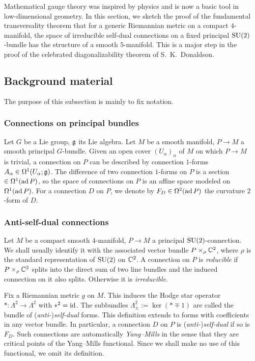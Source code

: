 Mathematical gauge theory was inspired by physics and 
is now a basic tool in low-dimensional geometry. 
In this section, we sketch the proof of the fundamental transversality 
theorem that for a generic Riemannian metric on a compact $4$-manifold, 
the space of irreducible self-dual connections on a fixed principal 
${\mathrm{SU}}(2)$-bundle has the structure of a smooth $5$-manifold. 
This is a major step in the proof of the celebrated 
diagonalizability theorem of S.\ K.\ Donaldson.

\subsection{Background material}
The purpose of this subsection is mainly to fix notation.

\subsubsection{Connections on principal bundles}
Let $G$ be a Lie group, ${\mathfrak{g}}$ its Lie algebra. 
Let $M$ be a smooth manifold, 
$P \to M$ a smooth principal $G$-bundle. 
Given an open cover $(U_\alpha)_\alpha$ of $M$ on which 
$P \to M$ is trivial, a connection on $P$ can be described 
by connection $1$-forms $A_\alpha \in \Omega^1 (U_\alpha; {\mathfrak{g}})$. 
The difference of two connection $1$-forms on $P$ 
is a section $\in \Omega^1 (\operatorname{ad} P)$, so the space of connections 
on $P$ is an affine space modeled on $\Omega^1 (\operatorname{ad} P)$. 
For a connection $D$ on $P$, we denote by 
$F_D \in \Omega^2 (\operatorname{ad} P)$ the curvature $2$-form of $D$.

\subsubsection{Anti-self-dual connections}
Let $M$ be a compact smooth $4$-manifold, 
$P \to M$ a principal ${\mathrm{SU}}(2)$-connection. 
We shall usually identify it with the associated vector bundle 
$P \times_\rho {\mathbb{C}}^2$, where $\rho$ is 
the standard representation of ${\mathrm{SU}}(2)$ on ${\mathbb{C}}^2$. 
A connection on $P$ is \textit{reducible} if $P \times_\rho {\mathbb{C}}^2$ 
splits into the direct sum of two line bundles and 
the induced connection on it also splits. 
Otherwise it is \textit{irreducible}.

Fix a Riemannian metric $g$ on $M$. 
This induces the Hodge star operator $* \colon \Lambda^2 \to \Lambda^2$ 
with $*^2 = {\mathrm{id}}$. 
The subbundles $\Lambda^2_\pm := \ker(* \mp 1)$ are called 
the bundle of (\textit{anti-})\textit{self-dual} forms. 
This definition extends to forms with coefficients in any vector bundle. 
In particular, a connection $D$ on $P$ is (\textit{anti-})\textit{self-dual} 
if so is $F_D$. 
Such connections are automatically \textit{Yang--Mills} 
in the sense that they are critical points of the Yang--Mills functional. 
Since we shall make no use of this functional, we omit its definition.

